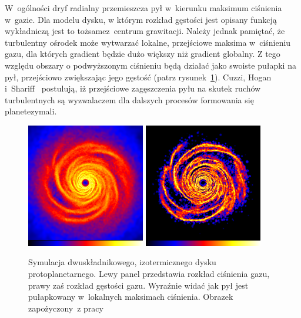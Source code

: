 \par W~ogólności dryf radialny przemieszcza pył w~kierunku maksimum ciśnienia 
w~gazie. Dla modelu dysku, w którym rozkład gęstości jest opisany funkcją
wykładniczą jest to tożsame\linebreak z~centrum grawitacji. Należy jednak pamiętać, że
turbulentny ośrodek może wytwarzać lokalne, przejściowe maksima w~ciśnieniu
gazu, dla których gradient będzie dużo większy niż gradient globalny. Z tego
względu obszary o podwyższonym ciśnieniu będą działać jako swoiste pułapki na
pył, przejściowo zwiększając jego gęstość (patrz rysunek~\ref{fig:chap1_trap}).
Cuzzi, Hogan i~Shariff~\citep{CHS08} postulują, iż przejściowe zagęszczenia pyłu
na skutek ruchów turbulentnych są wyzwalaczem dla dalszych procesów formowania
się planetezymali.
%
\begin{figure}
   \centering
   \includegraphics[width=0.46\textwidth]{figures/chap1_gasdisk.png}
   \includegraphics[width=0.46\textwidth]{figures/chap1_dustdisk.png}
   \caption[Pułapkowanie pyłu w lokalnych maksimach ciśnienia gazu.]
     {Symulacja dwuskładnikowego, izotermicznego dysku
      pro\-to\-pla\-ne\-tar\-ne\-go.
      Lewy panel przedstawia rozkład ciśnienia gazu, prawy zaś rozkład gęstości
      gazu. Wy\-raź\-nie widać jak pył jest pułapkowany w~lokalnych maksimach
      ciśnienia. Obrazek za\-po\-ży\-czo\-ny~z pracy~\cite{RLP2006}}
   \label{fig:chap1_trap}
\end{figure}

